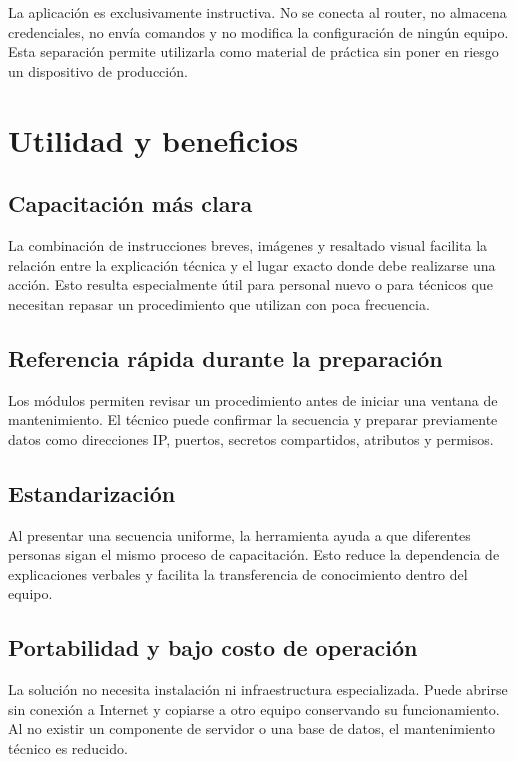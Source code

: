 \documentclass[12pt,letterpaper]{article}
\begin{document}
La aplicación es exclusivamente instructiva. No se conecta al router, no almacena
credenciales, no envía comandos y no modifica la configuración de ningún equipo.
Esta separación permite utilizarla como material de práctica sin poner en riesgo un
dispositivo de producción.

\section{Utilidad y beneficios}

\subsection{Capacitación más clara}

La combinación de instrucciones breves, imágenes y resaltado visual facilita la
relación entre la explicación técnica y el lugar exacto donde debe realizarse una
acción. Esto resulta especialmente útil para personal nuevo o para técnicos que
necesitan repasar un procedimiento que utilizan con poca frecuencia.

\subsection{Referencia rápida durante la preparación}

Los módulos permiten revisar un procedimiento antes de iniciar una ventana de
mantenimiento. El técnico puede confirmar la secuencia y preparar previamente
datos como direcciones IP, puertos, secretos compartidos, atributos y permisos.

\subsection{Estandarización}

Al presentar una secuencia uniforme, la herramienta ayuda a que diferentes personas
sigan el mismo proceso de capacitación. Esto reduce la dependencia de explicaciones
verbales y facilita la transferencia de conocimiento dentro del equipo.

\subsection{Portabilidad y bajo costo de operación}

La solución no necesita instalación ni infraestructura especializada. Puede abrirse
sin conexión a Internet y copiarse a otro equipo conservando su funcionamiento. Al
no existir un componente de servidor o una base de datos, el mantenimiento técnico
es reducido.
\end{document}
